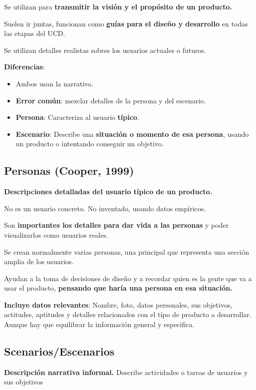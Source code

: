 \documentclass[12pt, twoside, openright]{report} %
\begin{document}
Se utilizan para \textbf{transmitir la visión y el propósito de un
	producto.}

Suelen ir juntas, funcionan como \textbf{guías para el diseño y
	desarrollo} en todas las etapas del UCD.

Se utilizan detalles realistas sobres los usuarios actuales o futuros.

\textbf{Diferencias}:

\begin{itemize}
	\item Ambos usan la narrativa.
	\item \textbf{Error común}: mezclar detalles de la persona y del escenario.
	\item \textbf{Persona}: Caracteriza al usuario \textbf{típico}.
	\item \textbf{Escenario}: Describe una \textbf{situación o momento de esa
		      persona}, usando un producto o intentando conseguir un objetivo.
\end{itemize}

\subsection{Personas (Cooper, 1999)}

\textbf{Descripciones detalladas del usuario típico de un producto.}

No es un usuario concreto. No inventado, usando datos empíricos.

Son \textbf{importantes los detalles para dar vida a las personas} y
poder visualizarlos como usuarios reales.

Se crean normalmente varias personas, una principal que representa una
sección amplia de los usuarios.

Ayudan a la toma de decisiones de diseño y a recordar quien es la gente
que va a usar el producto, \textbf{pensando que haría una persona en esa
	situación.}

\textbf{Incluye datos relevantes}: Nombre, foto, datos personales, sus
objetivos, actitudes, aptitudes y detalles relacionados con el tipo de
producto a desarrollar. Aunque hay que equilibrar la información general
y especifica.

\subsection{Scenarios/Escenarios}

\textbf{Descripción narrativa informal.} Describe actividades o tareas
de usuarios y sus objetivos
\end{document}
